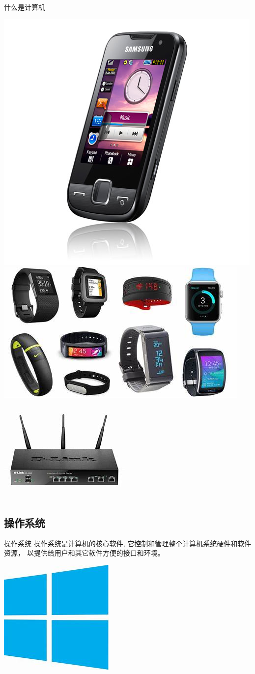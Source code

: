 \documentclass[14pt,t]{beamer}
\begin{document}
\begin{frame}{什么是计算机}

\begin{center}
\includegraphics[width=.2\textwidth]{handphone.jpg}
    \hspace{2mm}
\includegraphics[width=.2\textwidth]{wearables.jpg}
    \hspace{2mm}
\includegraphics[width=.3\textwidth]{router.jpg}
\end{center}

\end{frame}

\subsection{操作系统}

\begin{frame}{操作系统}
    操作系统是计算机的核心软件, 它控制和管理整个计算机系统硬件和软件资源，
    以提供给用户和其它软件方便的接口和环境。

\begin{center}
\includegraphics[width=.2\textwidth]{windowslogo.jpg}
\end{center}

\end{frame}
\end{document}
